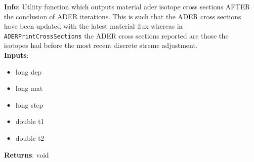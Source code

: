 \textbf{Info}: Utliity function which outputs material ader isotope cross
sections AFTER the conclusion of ADER iterations. This is such that the ADER
cross sections have been updated with the latest material flux whereas
in \texttt{ADERPrintCrossSections} the ADER cross sections reported are those
the isotopes had before the most recent discrete streme adjustment. \\ 

\noindent \textbf{Inputs}:
\begin{itemize}
\item{long dep}
\item{long mat}
\item{long step}
\item{double t1}
\item{double t2}
\end{itemize}

\noindent \textbf{Returns}: void
